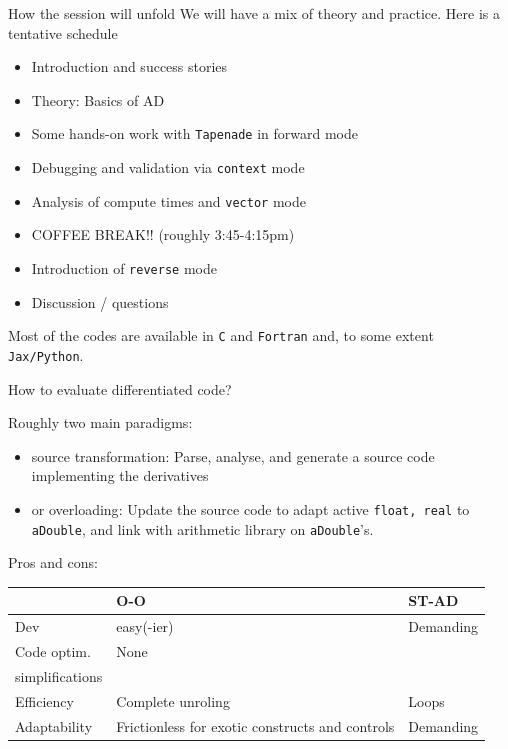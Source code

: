 \documentclass[12pt,xcolor={table}]{beamer}
\begin{document}
\begin{frame}{How the session will unfold}
  We will have a mix of theory and practice. Here is a tentative schedule
  \begin{itemize}
    \item Introduction and success stories
    \item Theory: Basics of AD
    \item Some hands-on work with \texttt{Tapenade} in forward mode
    \item Debugging and validation via \texttt{context} mode
    \item Analysis of compute times and \texttt{vector} mode
    \item COFFEE BREAK!! (roughly 3:45-4:15pm)
    \item Introduction of \texttt{reverse} mode
    \item Discussion / questions
  \end{itemize}
  Most of the codes are available in \texttt{C} and \texttt{Fortran} and, to some extent \texttt{Jax/Python}.
\end{frame}

\begin{frame}{How to evaluate differentiated code?}

Roughly two main paradigms: 
\begin{itemize}
\item {\color{darkerred} source transformation}: Parse, analyse, and generate a source code implementing the derivatives
\item or {\color{darkerred} overloading}: Update the source code to adapt {\color{darkerred} active} {\tt float, real} to {\tt aDouble},
and link with arithmetic library on {\tt aDouble}'s.
\end{itemize}


Pros and cons: 
\begin{tabular}{|l||l|l|}
\hline
 & O-O & ST-AD \\ 
\hline
\hline
Dev & easy(-ier) & Demanding \\ 
\hline
Code optim. & \begin{minipage}[t]{.43\linewidth} None \end{minipage} & \begin{minipage}[t]{.30\linewidth}
Various analysis, \\ simplifications
\end{minipage} \\ 
\hline 
Efficiency & Complete unroling & Loops \\ 
\hline
Adaptability & \begin{minipage}[t]{.43\linewidth}Frictionless for exotic constructs and controls \end{minipage} & \begin{minipage}[t]{.30\linewidth}Demanding \end{minipage}\\ 
\hline
\end{tabular}
\end{frame}
\end{document}
